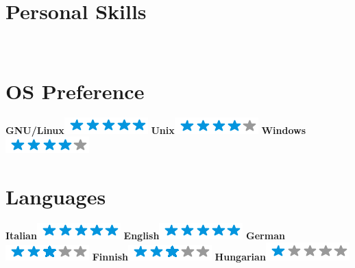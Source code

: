 \documentclass[]{friggeri-cv}
\begin{document}
\begin{aside}
  \section{Personal Skills}
    ~
    \section{OS Preference}
    \textbf{GNU/Linux}\includegraphics[scale=0.40]{img/5stars.png}
    \textbf{Unix}\includegraphics[scale=0.40]{img/4stars.png}
    \textbf{Windows}\includegraphics[scale=0.40]{img/4stars.png}
    ~
  \section{Languages}
    \textbf{Italian}\includegraphics[scale=0.40]{img/5stars.png}
    \textbf{English}\includegraphics[scale=0.40]{img/5stars.png}
    \textbf{German}\includegraphics[scale=0.40]{img/3stars.png}
    \textbf{Finnish}\includegraphics[scale=0.40]{img/3stars.png}
    \textbf{Hungarian}\includegraphics[scale=0.40]{img/1stars.png}
    ~

\end{aside}
\end{document}
